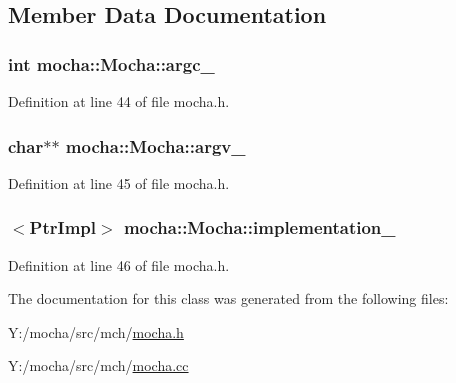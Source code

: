 \subsection{Member Data Documentation}
\hypertarget{classmocha_1_1_mocha_af3e6211e0cea6065db27cd938d9a1361}{
\subsubsection[{argc\_\-}]{\setlength{\rightskip}{0pt plus 5cm}int {\bf mocha::Mocha::argc\_\-}}}
\label{classmocha_1_1_mocha_af3e6211e0cea6065db27cd938d9a1361}


Definition at line 44 of file mocha.h.

\hypertarget{classmocha_1_1_mocha_a50456e24864dfbe295e9461391b5f698}{
\subsubsection[{argv\_\-}]{\setlength{\rightskip}{0pt plus 5cm}char$\ast$$\ast$ {\bf mocha::Mocha::argv\_\-}}}
\label{classmocha_1_1_mocha_a50456e24864dfbe295e9461391b5f698}


Definition at line 45 of file mocha.h.

\hypertarget{classmocha_1_1_mocha_a2af59606fa365d8a4cb949ee152cedf1}{
\subsubsection[{implementation\_\-}]{$<${\bf PtrImpl}$>$ {\bf mocha::Mocha::implementation\_\-}}}
\label{classmocha_1_1_mocha_a2af59606fa365d8a4cb949ee152cedf1}


Definition at line 46 of file mocha.h.



The documentation for this class was generated from the following files:\begin{DoxyCompactItemize}
\item 
Y:/mocha/src/mch/\hyperlink{mocha_8h}{mocha.h}\item 
Y:/mocha/src/mch/\hyperlink{mocha_8cc}{mocha.cc}\end{DoxyCompactItemize}
